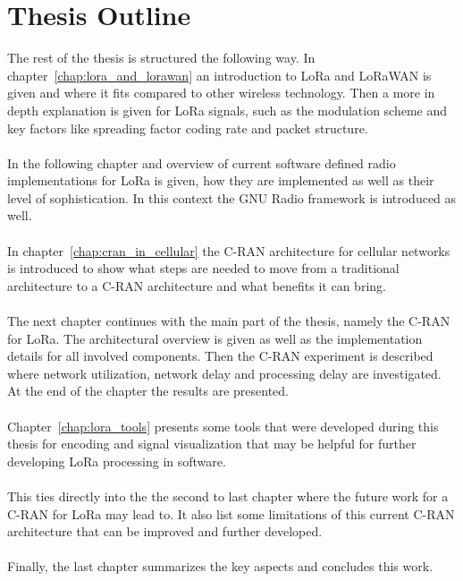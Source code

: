 \section{Thesis Outline}
The rest of the thesis is structured the following way.
In chapter~\ref{chap:lora_and_lorawan} an introduction to LoRa and 
LoRaWAN is given and where it fits compared to other wireless technology. 
Then a more in depth explanation is given for LoRa signals, such as the modulation scheme and key 
factors like spreading factor coding rate and packet structure.
\\
\\
In the following chapter and overview of current software defined radio implementations for LoRa is given,
how they are implemented as well as their level of sophistication. In this context the GNU Radio 
framework is introduced as well.
\\
\\
In chapter~\ref{chap:cran_in_cellular} the C-RAN architecture for cellular networks 
is introduced to show what steps are needed to move from a traditional architecture to a C-RAN architecture
and what benefits it can bring. 
\\
\\
The next chapter continues with the main part of the thesis, namely the C-RAN for LoRa. 
The architectural overview is given as well as the implementation details for all 
involved components. Then the C-RAN experiment is described where 
network utilization, network delay and processing delay are investigated.
At the end of the chapter the results are presented.
\\
\\
Chapter~\ref{chap:lora_tools} presents some tools that were developed 
during this thesis for encoding and signal visualization that may be helpful
for further developing LoRa processing in software.
\\
\\
This ties directly into the the second to last chapter where the future work 
for a C-RAN for LoRa may lead to. It also list some limitations of this current 
C-RAN architecture that can be improved and further developed.
\\
\\
Finally, the last chapter summarizes the key aspects and concludes this work.


